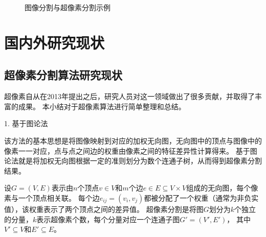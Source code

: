 \begin{figure}[h]

\caption{图像分割与超像素分割示例}
\label{fig1.1}
\end{figure}

\section{国内外研究现状}

\subsection{超像素分割算法研究现状}


超像素\cite{ren2003learning}自从在2013年提出之后，研究人员对这一领域做出了很多贡献，并取得了丰富的成果。
本小结对于超像素算法进行简单整理和总结。

1. 基于图论法

该方法的基本思想是将图像映射到对应的加权无向图，无向图中的顶点与图像中的像素一一对应，点与点之间边的权重由像素之间的特征差异性计算得来。
基于图论法就是将加权无向图根据一定的准则划分为数个连通子树，从而得到超像素分割结果。

设$G=(V,E)$表示由$n$个顶点$v\in V$和$m$个边$e\in E\subseteq V\times V$组成的无向图，每个像素与一个顶点相关联。
每个边$e_{ij}=(v_i,v_j)$都被分配了一个权重（通常为非负实值），该权重表示了两个顶点之间的差异值。
超像素分割是将图$G$划分为$k$个独立的分量，$k$表示超像素个数，每个分量对应一个连通子图${G}'=({V}',{E}')$，
其中${V}'\subseteq V$和${E}'\subseteq E$。

